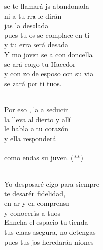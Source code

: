 \begin{cancion}%
	 se te llamará js abandonada \\
	ni a tu rra le dirán \\
	jas la desolada \\
	pues tu os se complace en ti \\
	y tu erra será desada.\\
\jump
	Y mo joven se a con doncella\\
	se ará coigo tu Hacedor\\
	y con zo de esposo con su via\\
	se zará por ti tuos. \\\jump\\
	\begin{chorus}%
	Por eso , la  a seducir\\
	la lleva al dierto y allí\\
	le habla a tu corazón \\
	y ella  responderá\\
{}\vspace*{-0.4cm}\\
	como endas su juven. (**)\\
	\end{chorus}%
	\jump\\
	Yo  desposaré cigo para siempre\\
	te desarén fidelidad,\\
	en ar y en comprensn \\
	y  conocerás a tuos\\
\jump
	Enncha el espacio tu tienda\\
	tus claas asegura, no  detengas\\
	pues tus jos heredarán niones\\

\end{cancion}
